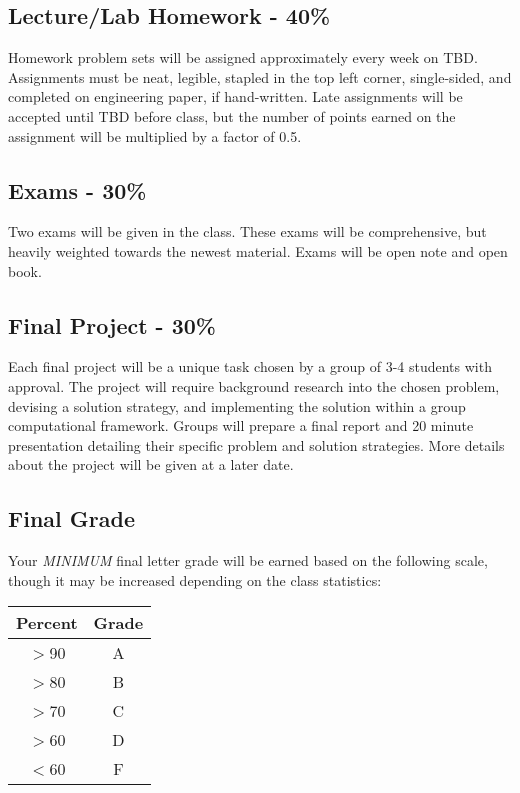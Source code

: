 \documentclass[12pt,letterpaper]{article}
\begin{document}
\subsection*{Lecture/Lab Homework - 40\%}
Homework problem sets will be assigned approximately every week on TBD.
Assignments must be neat, legible, stapled in the top left corner, single-sided, and completed on engineering paper, if hand-written.
Late assignments will be accepted until TBD before class, but the number of points earned on the assignment will be multiplied by a factor of 0.5.

\subsection*{Exams - 30\%}
Two exams will be given in the class.
These exams will be comprehensive, but heavily weighted towards the newest material.
Exams will be open note and open book.

\subsection*{Final Project - 30\%}
Each final project will be a unique task chosen by a group of 3-4 students with approval.
The project will require background research into the chosen problem, devising a solution strategy, and implementing the solution within a group computational framework.
Groups will prepare a final report and 20 minute presentation detailing their specific problem and solution strategies.
More details about the project will be given at a later date.

\subsection*{Final Grade}
Your \emph{MINIMUM} final letter grade will be earned based on the following scale, though it may be increased depending on the class statistics:
\begin{center}
    \begin{tabular}{ | c | c |}
    \hline
    Percent & Grade \\ \hline
    $>$90 & A \\ \hline
    $>$80 & B \\ \hline
    $>$70 & C \\ \hline
    $>$60 & D \\ \hline
    $<$60 & F \\
    \hline
    \end{tabular}
\end{center}
\end{document}
